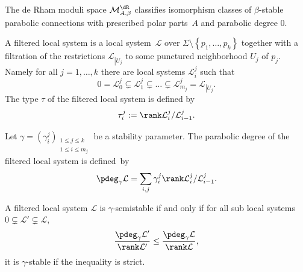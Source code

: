 \begin{notations}
The de Rham moduli space $\mathcal{M}^{\dR}_{A,\beta}$ classifies isomorphism classes of $\beta$-stable parabolic connections with prescribed polar parts~$A$ and parabolic degree $0$.
\end{notations}

\label{subsect_resol_filtered_local}
\begin{definition}
A filtered local system is a local system~$\mathcal{L}$ over $\Sigma\setminus\left\lbrace p_1,\dots,p_k\right\rbrace$ together with a filtration of the restrictions $\mathcal{L}_{\left|U_j\right.}$ to some punctured neighborhood $U_j$ of $p_j$. Namely for all $j=1,\dots,k$ there are local systems $\mathcal{L}^j_i$ such that
\[
0 = \mathcal{L}^j_0 \subsetneq \mathcal{L}^j_1 \subsetneq \dots\subsetneq \mathcal{L}^j_{m_j} = \mathcal{L}_{\left|U_j\right.}.
\]
The type $\tau$ of the filtered local system is defined by
\[
\tau^j_i := \rank \mathcal{L}^j_i/ \mathcal{L}^j_{i-1}.
\]
\end{definition}

\begin{definition}
Let $\gamma =(\gamma^j_i)_{\substack{1\le j \le k \\ 1 \le i \le m_j}}$ be a stability parameter. The parabolic degree of the filtered local system is defined~by
\[
\pdeg_{\gamma} \mathcal{L} = \sum_{i,j} \gamma^j_i \rank \mathcal{L}^j_i / \mathcal{L}^j_{i-1}.
\]
\end{definition}

A filtered local system $\mathcal{L}$ is $\gamma$-semistable if and only if for all sub local systems $ 0 \subsetneq \mathcal{L}' \subsetneq \mathcal{L}$,
\[
\frac{\pdeg_{\gamma} \mathcal{L}'}{\rank \mathcal{L}'} \le \frac{\pdeg_{\gamma} \mathcal{L}}{\rank \mathcal{L}},
\]
it is $\gamma$-stable if the inequality is strict.

